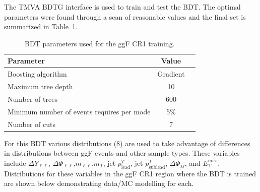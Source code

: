 The TMVA BDTG interface is used to train and test the BDT. The optimal parameters were found through a scan of reasonable values and the final set is summarized in Table~\ref{tab:ggFCR1BDTparameters}.
\begin{table}[h!]
\centering
\begin{tabular}{|l|c|c|}
\hline
Parameter                                    & Value     \\
\hline
Boosting algorithm                           & Gradient \\
Maximum tree depth                           &  10      \\
Number of trees                              &  600    \\
Minimum number of events requires per mode   &  5\%     \\ 
Number of cuts                               &  7       \\
\hline
\end{tabular}
\caption{BDT parameters used for the ggF CR1 training.}
\label{tab:ggFCR1BDTparameters}
\end{table}
For this BDT various distributions (8) are used to take advantage of differences in distributions between ggF events and other sample types. These variables include $\Delta Y_{\ell\ell}$, $\Delta \Phi_{\ell\ell}$,$m_{\ell\ell}$,$m_T$, jet $p^T_{\text{lead}}$, jet $p^T_{\text{sublead}}$, $\Delta \Phi_{jj}$, and $\ensuremath{E_{\text{T}}^{\text{miss}}}$. Distributions for these variables in the ggF CR1 region where the BDT is trained are shown below demonstrating data/MC modelling for each.
